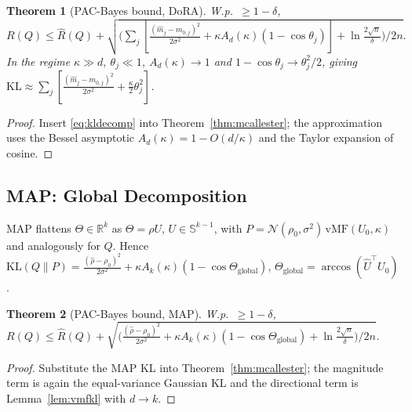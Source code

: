 \documentclass[11pt]{article}
\newtheorem{theorem}{Theorem}
\newcommand{\KL}{\mathrm{KL}}
\newcommand{\vMF}{\mathrm{vMF}}
\newcommand{\Risk}{R}
\newcommand{\eRisk}{\hat{R}}
\newcommand{\Thetaglob}{\Theta_{\mathrm{global}}}
\newcommand{\R}{\mathbb{R}}
\begin{document}
\begin{theorem}[PAC-Bayes bound, DoRA]\label{thm:dora-bound}
W.p.\ $\ge1-\delta$,
$\Risk(Q)\le\eRisk(Q)+\sqrt{\big(\sum_j[\frac{(\hat m_j-m_{0,j})^2}{2\sigma^2}
+\kappa A_d(\kappa)(1-\cos\theta_j)]+\ln\frac{2\sqrt n}{\delta}\big)/2n}.$
In the regime $\kappa\gg d,\ \theta_j\ll1$, $A_d(\kappa)\to1$ and $1-\cos\theta_j\to\theta_j^2/2$,
giving $\KL\approx\sum_j[\frac{(\hat m_j-m_{0,j})^2}{2\sigma^2}+\frac\kappa2\theta_j^2]$.
\end{theorem}
\begin{proof}
Insert \eqref{eq:kldecomp} into Theorem~\ref{thm:mcallester}; the approximation uses
the Bessel asymptotic $A_d(\kappa)=1-O(d/\kappa)$ and the Taylor expansion of cosine.
\end{proof}

\subsection{MAP: Global Decomposition}
MAP flattens $\Theta\in\R^k$ as $\Theta=\rho U$, $U\in\mathbb{S}^{k-1}$, with
$P=\mathcal{N}(\rho_0,\sigma^2)\,\vMF(U_0,\kappa)$ and analogously for $Q$. Hence
$\KL(Q\|P)=\frac{(\hat\rho-\rho_0)^2}{2\sigma^2}+\kappa A_k(\kappa)(1-\cos\Thetaglob)$,
$\Thetaglob=\arccos(\hat U^\top U_0)$.

\begin{theorem}[PAC-Bayes bound, MAP]\label{thm:map-bound}
W.p.\ $\ge1-\delta$,
$\Risk(Q)\le\eRisk(Q)+\sqrt{\big(\frac{(\hat\rho-\rho_0)^2}{2\sigma^2}
+\kappa A_k(\kappa)(1-\cos\Thetaglob)+\ln\frac{2\sqrt n}{\delta}\big)/2n}.$
\end{theorem}
\begin{proof}
Substitute the MAP KL into Theorem~\ref{thm:mcallester}; the magnitude term is again
the equal-variance Gaussian KL and the directional term is Lemma~\ref{lem:vmfkl} with
$d\!\to\!k$.
\end{proof}
\end{document}
